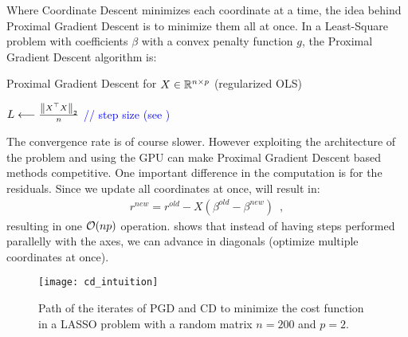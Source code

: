 \documentclass[../main.tex]{subfiles}
\begin{document}
Where Coordinate Descent minimizes each coordinate at a time, the idea
behind Proximal Gradient Descent is to minimize them all at once.
In a Least-Square problem with coefficients $\beta$ with a convex penalty function
$g$, the Proximal Gradient Descent algorithm is:

\begin{algorithm}[H]
	\caption{Proximal Gradient Descent for $X\in\mathbb{R}^{n\times p}$
	(regularized OLS)}
	$L \longleftarrow \frac{\left \lVert X^\top X \right \rVert_2}{n}$ \hspace{2cm} \textcolor{blue}{// step size (see )}


	\Output{$\beta$}
	\label{algo:Algo_PGD}
\end{algorithm}

The convergence rate is of course slower.
However exploiting the architecture of the problem and using the GPU can
make Proximal Gradient Descent based methods competitive.
One important difference in the computation is for the residuals.
Since we update all coordinates at once,  will result in:
\begin{align}
	r^{new} = r^{old} - X(\beta^{old} - \beta^{new})\enspace,
\end{align}
resulting in one $\mathcal{O}(np)$ operation.
 shows that instead of having steps performed
parallelly with the axes, we can advance in diagonals
(optimize multiple coordinates at once).
\begin{figure}[h]
	\centering
	\texttt{[image: cd\_intuition]}
	\caption{Path of the iterates of PGD and CD to minimize the cost function in a LASSO
	problem with a random matrix $n=200$ and $p=2$.}
	\label{fig:cd_intuition}
\end{figure}

\medskip
\end{document}
